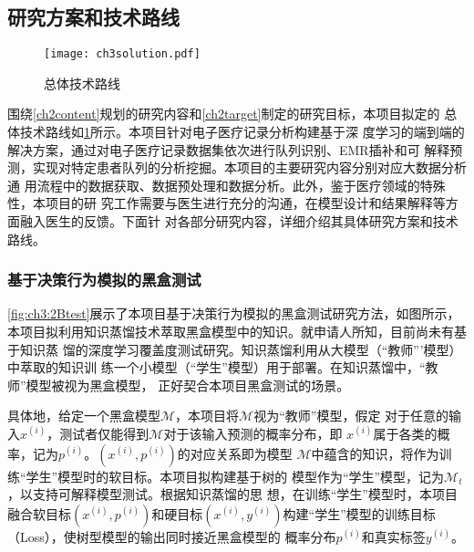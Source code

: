 \subsection{研究方案和技术路线}

\begin{figure}[h]
    \begin{small}
        \begin{center}
            \texttt{[image: ch3solution.pdf]}
        \end{center}
        \caption{总体技术路线}
        \label{fig:ch3:solution}
    \end{small}
\end{figure}

围绕\ref{ch2content}规划的研究内容和\ref{ch2target}制定的研究目标，本项目拟定的
总体技术路线如\cref{fig:ch3:solution}所示。本项目针对电子医疗记录分析构建基于深
度学习的端到端的解决方案，通过对电子医疗记录数据集依次进行队列识别、EMR插补和可
解释预测，实现对特定患者队列的分析挖掘。本项目的主要研究内容分别对应大数据分析通
用流程中的数据获取、数据预处理和数据分析。此外，鉴于医疗领域的特殊性，本项目的研
究工作需要与医生进行充分的沟通，在模型设计和结果解释等方面融入医生的反馈。下面针
对各部分研究内容，详细介绍其具体研究方案和技术路线。



\subsubsection{基于决策行为模拟的黑盒测试}\label{ch3_1}

\cref{fig:ch3:2Btest}展示了本项目基于决策行为模拟的黑盒测试研究方法，如图所示，
本项目拟利用知识蒸馏技术萃取黑盒模型中的知识。就申请人所知，目前尚未有基于知识蒸
馏的深度学习覆盖度测试研究。知识蒸馏利用从大模型（``教师'''模型）中萃取的知识训
练一个小模型（``学生''模型）用于部署。在知识蒸馏中，``教师''模型被视为黑盒模型，
正好契合本项目黑盒测试的场景。

具体地，给定一个黑盒模型$\mathcal M$，本项目将$\mathcal M$视为``教师''模型，假定
对于任意的输入$x^{(i)}$，测试者仅能得到$\mathcal M$对于该输入预测的概率分布，即
$x^{(i)}$属于各类的概率，记为$p^{(i)}$。$(x^{(i)}, p^{(i)})$的对应关系即为模型
$\mathcal M$中蕴含的知识，将作为训练``学生''模型时的软目标。本项目拟构建基于树的
模型作为``学生''模型，记为$\mathcal M_t$，以支持可解释模型测试。根据知识蒸馏的思
想，在训练``学生''模型时，本项目融合软目标$(x^{(i)}, p^{(i)})$和硬目标$(x^{(i)},
y^{(i)})$构建``学生''模型的训练目标（Loss），使树型模型的输出同时接近黑盒模型的
概率分布$p^{(i)}$和真实标签$y^{(i)}$。

